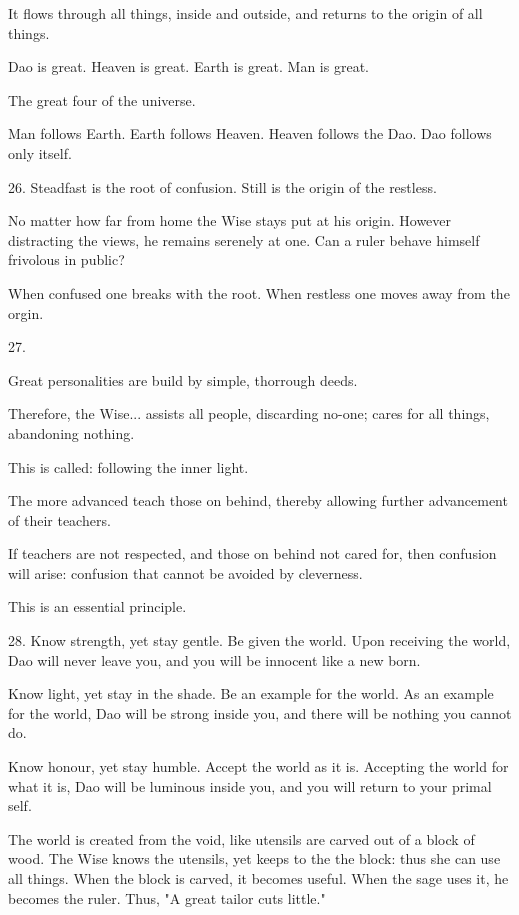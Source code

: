 \documentclass[10pt,a4paper]{book}
\begin{document}
It ﬂows through all things, inside and outside,
and returns to the origin of all things.

Dao is great.
Heaven is great.
Earth is great.
Man is great.

The great four of the universe.

Man follows Earth.
Earth follows Heaven.
Heaven follows the Dao.
Dao follows only itself.


26.
Steadfast is the root of confusion.
Still is the origin of the restless.

No matter how far from home the Wise stays put at his origin.
However distracting the views, he remains serenely at one.
Can a ruler behave himself frivolous in public?

When confused one breaks with the root.
When restless one moves away from the orgin.


27.

Great personalities are build by simple, thorrough deeds.

Therefore, the Wise...
assists all people, discarding no-one;
cares for all things, abandoning nothing.

This is called: following the inner light.

The more advanced teach those on behind,
thereby allowing further advancement of their teachers.

If teachers are not respected,
and those on behind not cared for,
then confusion will arise:
confusion that cannot be avoided by cleverness.

This is an essential principle.


28.
Know strength, yet stay gentle. Be given the world.
Upon receiving the world, Dao will never leave you,
and you will be innocent like a new born.

Know light, yet stay in the shade. Be an example for the world.
As an example for the world, Dao will be strong inside you,
and there will be nothing you cannot do.

Know honour, yet stay humble. Accept the world as it is.
Accepting the world for what it is, Dao will be luminous inside you,
and you will return to your primal self.

The world is created from the void,
like utensils are carved out of a block of wood.
The Wise knows the utensils,
yet keeps to the the block:
thus she can use all things.
When the block is carved, it becomes useful.
When the sage uses it, he becomes the ruler.
Thus, "A great tailor cuts little."
\end{document}
